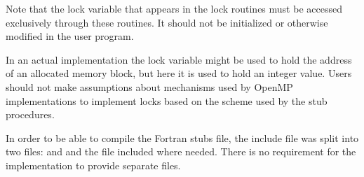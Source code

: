 Note that the lock variable that appears in the lock routines must be accessed
exclusively through these routines. It should not be initialized or otherwise modified in
the user program.

In an actual implementation the lock variable might be used to hold the address of an
allocated memory block, but here it is used to hold an integer value. Users should not
make assumptions about mechanisms used by OpenMP implementations to implement
locks based on the scheme used by the stub procedures.

\begin{fortranspecific}

In order to be able to compile the Fortran stubs file, the include file
 was split into two files:  and  and the
 file included where needed. There is no requirement for the
implementation to provide separate files.

\end{fortranspecific}


\filbreak



